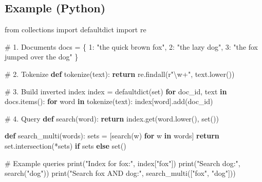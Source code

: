 \documentclass[
  letterpaper,
  DIV=11,
  numbers=noendperiod]{scrreprt}
\newenvironment{Shaded}{\begin{snugshade}}{\end{snugshade}}
\newcommand{\BuiltInTok}[1]{\textcolor[rgb]{0.00,0.23,0.31}{#1}}
\newcommand{\CommentTok}[1]{\textcolor[rgb]{0.37,0.37,0.37}{#1}}
\newcommand{\ControlFlowTok}[1]{\textcolor[rgb]{0.00,0.23,0.31}{\textbf{#1}}}
\newcommand{\DecValTok}[1]{\textcolor[rgb]{0.68,0.00,0.00}{#1}}
\newcommand{\ImportTok}[1]{\textcolor[rgb]{0.00,0.46,0.62}{#1}}
\newcommand{\KeywordTok}[1]{\textcolor[rgb]{0.00,0.23,0.31}{\textbf{#1}}}
\newcommand{\NormalTok}[1]{\textcolor[rgb]{0.00,0.23,0.31}{#1}}
\newcommand{\OperatorTok}[1]{\textcolor[rgb]{0.37,0.37,0.37}{#1}}
\newcommand{\StringTok}[1]{\textcolor[rgb]{0.13,0.47,0.30}{#1}}
\newcommand{\VerbatimStringTok}[1]{\textcolor[rgb]{0.13,0.47,0.30}{#1}}
\begin{document}
\subsection{Example (Python)}\label{example-python-11}

\begin{Shaded}
\begin{Highlighting}[]
\ImportTok{from}\NormalTok{ collections }\ImportTok{import}\NormalTok{ defaultdict}
\ImportTok{import}\NormalTok{ re}

\CommentTok{\# 1. Documents}
\NormalTok{docs }\OperatorTok{=}\NormalTok{ \{}
    \DecValTok{1}\NormalTok{: }\StringTok{"the quick brown fox"}\NormalTok{,}
    \DecValTok{2}\NormalTok{: }\StringTok{"the lazy dog"}\NormalTok{,}
    \DecValTok{3}\NormalTok{: }\StringTok{"the fox jumped over the dog"}
\NormalTok{\}}

\CommentTok{\# 2. Tokenize}
\KeywordTok{def}\NormalTok{ tokenize(text):}
    \ControlFlowTok{return}\NormalTok{ re.findall(}\VerbatimStringTok{r"}\DecValTok{\textbackslash{}w}\OperatorTok{+}\VerbatimStringTok{"}\NormalTok{, text.lower())}

\CommentTok{\# 3. Build inverted index}
\NormalTok{index }\OperatorTok{=}\NormalTok{ defaultdict(}\BuiltInTok{set}\NormalTok{)}
\ControlFlowTok{for}\NormalTok{ doc\_id, text }\KeywordTok{in}\NormalTok{ docs.items():}
    \ControlFlowTok{for}\NormalTok{ word }\KeywordTok{in}\NormalTok{ tokenize(text):}
\NormalTok{        index[word].add(doc\_id)}

\CommentTok{\# 4. Query}
\KeywordTok{def}\NormalTok{ search(word):}
    \ControlFlowTok{return}\NormalTok{ index.get(word.lower(), }\BuiltInTok{set}\NormalTok{())}

\KeywordTok{def}\NormalTok{ search\_multi(words):}
\NormalTok{    sets }\OperatorTok{=}\NormalTok{ [search(w) }\ControlFlowTok{for}\NormalTok{ w }\KeywordTok{in}\NormalTok{ words]}
    \ControlFlowTok{return} \BuiltInTok{set}\NormalTok{.intersection(}\OperatorTok{*}\NormalTok{sets) }\ControlFlowTok{if}\NormalTok{ sets }\ControlFlowTok{else} \BuiltInTok{set}\NormalTok{()}

\CommentTok{\# Example queries}
\BuiltInTok{print}\NormalTok{(}\StringTok{"Index for \textquotesingle{}fox\textquotesingle{}:"}\NormalTok{, index[}\StringTok{"fox"}\NormalTok{])}
\BuiltInTok{print}\NormalTok{(}\StringTok{"Search \textquotesingle{}dog\textquotesingle{}:"}\NormalTok{, search(}\StringTok{"dog"}\NormalTok{))}
\BuiltInTok{print}\NormalTok{(}\StringTok{"Search \textquotesingle{}fox AND dog\textquotesingle{}:"}\NormalTok{, search\_multi([}\StringTok{"fox"}\NormalTok{, }\StringTok{"dog"}\NormalTok{]))}
\end{Highlighting}
\end{Shaded}
\end{document}
